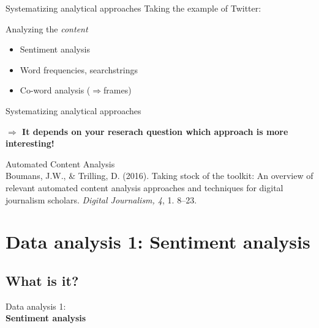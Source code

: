 \documentclass{beamer}
\begin{document}
\begin{frame}{Systematizing analytical approaches}
Taking the example of Twitter:
\begin{block}{Analyzing the \emph{content}}
\begin{itemize}
\item Sentiment analysis
\item Word frequencies, searchstrings
\item Co-word analysis ($\Rightarrow$frames)
\end{itemize}
\end{block}
\end{frame}

\begin{frame}{Systematizing analytical approaches}

{\textbf{$\Rightarrow$ It depends on your reserach question which approach is more interesting!}}
\end{frame}






\begin{frame}{Automated Content Analysis}
	\\
	\tiny
	Boumans, J.W., \& Trilling, D. (2016). Taking stock of the toolkit: An overview of relevant automated content analysis approaches and techniques for digital journalism scholars. \emph{Digital Journalism, 4}, 1. 8--23.
\end{frame}






\section[Sentiment analysis]{Data analysis 1: Sentiment analysis}
\subsection{What is it?}
\begin{frame}
Data analysis 1:\\
\textbf{Sentiment analysis}
\end{frame}
\end{document}
